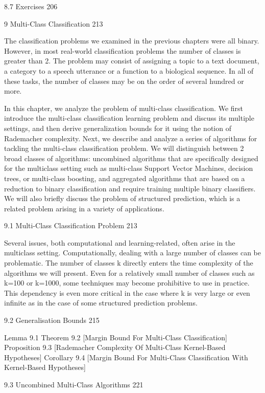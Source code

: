 8.7 Exercises 206



9 Multi-Class Classification 213

The classification problems we examined in the previous chapters were all binary. However, in most real-world classification problems the number of classes is greater than 2. The problem may consist of assigning a topic to a text document, a category to a speech utterance or a function to a biological sequence. In all of these tasks, the number of classes may be on the order of several hundred or more.

In this chapter, we analyze the problem of multi-class classification. We first introduce the multi-class classification learning problem and discuss its multiple settings, and then derive generalization bounds for it using the notion of Rademacher complexity. Next, we describe and analyze a series of algorithms for tackling the multi-class classification problem. We will distinguish between 2 broad classes of algorithms: uncombined algorithms that are specifically designed for the multiclass setting such as multi-class Support Vector Machines, decision trees, or multi-class boosting, and aggregated algorithms that are based on a reduction to binary classification and require training multiple binary classifiers. We will also briefly discuss the problem of structured prediction, which is a related problem arising in a variety of applications.

9.1 Multi-Class Classification Problem 213

Several issues, both computational and learning-related, often arise in the multiclass setting. Computationally, dealing with a large number of classes can be problematic. The number of classes k directly enters the time complexity of the algorithms we will present. Even for a relatively small number of classes such as k=100 or k=1000, some techniques may become prohibitive to use in practice. This dependency is even more critical in the case where k is very large or even infinite as in the case of some structured prediction problems.

9.2 Generalisation Bounds 215

Lemma 9.1
Theorem 9.2 [Margin Bound For Multi-Class Classification]
Proposition 9.3 [Rademacher Complexity Of Multi-Class Kernel-Based Hypotheses]
Corollary 9.4 [Margin Bound For Multi-Class Classification With Kernel-Based Hypotheses]

9.3 Uncombined Multi-Class Algorithms 221

